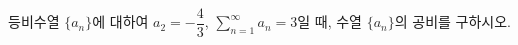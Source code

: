 등비수열 $\{a_n\}$에 대하여 $a_2=-\dfrac{4}{3}$, $\displaystyle\sum_{n=1}^{\infty}a_n=3$일 때, 수열 $\{a_n\}$의 공비를 구하시오.
